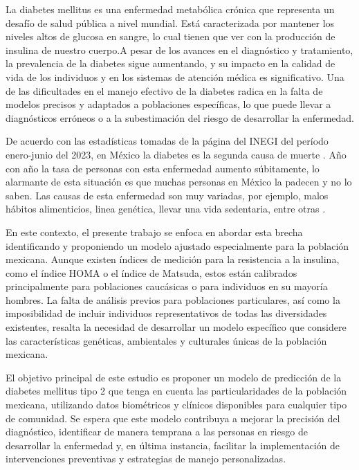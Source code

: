 

La diabetes mellitus es una enfermedad metabólica crónica que representa un desafío de salud pública a nivel mundial. Está caracterizada por mantener los niveles altos de glucosa en sangre, lo cual tienen que ver con la producción de insulina de nuestro cuerpo.A pesar de los avances en el diagnóstico y tratamiento, la prevalencia de la diabetes sigue aumentando, y su impacto en la calidad de vida de los individuos y en los sistemas de atención médica es significativo. Una de las dificultades en el manejo efectivo de la diabetes radica en la falta de modelos precisos y adaptados a poblaciones específicas, lo que puede llevar a diagnósticos erróneos o a la subestimación del riesgo de desarrollar la enfermedad.

De acuerdo con las estadísticas tomadas de la página del INEGI del período enero-junio del 2023, en México la diabetes es la segunda causa de muerte \cite{INEGI}. Año con año la tasa de personas con esta enfermedad aumento súbitamente, lo alarmante de esta situación es que muchas personas en México la padecen y no lo saben. Las causas de esta enfermedad son muy variadas, por ejemplo, malos hábitos alimenticios, linea genética, llevar una vida sedentaria, entre otras \cite{PromoSaludMexico}.

En este contexto, el presente trabajo se enfoca en abordar esta brecha identificando y proponiendo un modelo ajustado especialmente para la población mexicana. Aunque existen índices de medición para la resistencia a la insulina, como el índice HOMA o el índice de Matsuda, estos están calibrados principalmente para poblaciones caucásicas o para individuos en su mayoría hombres. La falta de análisis previos para poblaciones particulares, así como la imposibilidad de incluir individuos representativos de todas las diversidades existentes, resalta la necesidad de desarrollar un modelo específico que considere las características genéticas, ambientales y culturales únicas de la población mexicana.

El objetivo principal de este estudio es proponer un modelo de predicción de la diabetes mellitus tipo 2 que tenga en cuenta las particularidades de la población mexicana, utilizando datos biométricos y clínicos disponibles para cualquier tipo de comunidad. Se espera que este modelo contribuya a mejorar la precisión del diagnóstico, identificar de manera temprana a las personas en riesgo de desarrollar la enfermedad y, en última instancia, facilitar la implementación de intervenciones preventivas y estrategias de manejo personalizadas.

